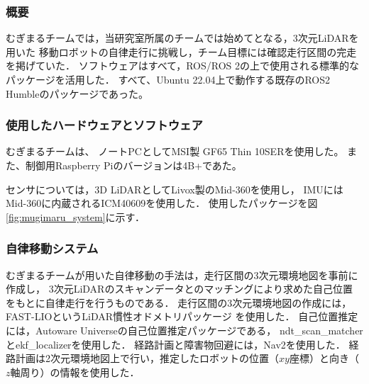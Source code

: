 \documentclass[twocolumn,9pt]{jsproceedings}
\begin{document}
\subsubsection{概要}

むぎまるチームでは，当研究室所属のチームでは始めてとなる，3次元LiDARを用いた
移動ロボットの自律走行に挑戦し，チーム目標には確認走行区間の完走を掲げていた．
ソフトウェアはすべて，ROS/ROS 2の上で使用される標準的なパッケージを活用した．
すべて、Ubuntu 22.04上で動作する既存のROS2 Humbleのパッケージであった。

\subsubsection{使用したハードウェアとソフトウェア}

むぎまるチームは、
ノートPCとしてMSI製 GF65 Thin 10SERを使用した。
また、制御用Raspberry Piのバージョンは4B+であた。

センサについては，3D LiDARとしてLivox製のMid-360を使用し，
IMUにはMid-360に内蔵されるICM40609を使用した．
使用したパッケージを図\ref{fig:mugimaru_system}に示す．

\subsubsection{自律移動システム}

むぎまるチームが用いた自律移動の手法は，走行区間の3次元環境地図を事前に作成し，
3次元LiDARのスキャンデータとのマッチングにより求めた自己位置
をもとに自律走行を行うものである．
走行区間の3次元環境地図の作成には，FAST-LIOというLiDAR慣性オドメトリパッケージ
\cite{fastlio}を使用した．
自己位置推定には，Autoware Universeの自己位置推定パッケージである，
ndt\_scan\_matcherとekf\_localizerを使用した\cite{autoware}．
経路計画と障害物回避には，Nav2を使用した\cite{nav2}．
経路計画は2次元環境地図上で行い，推定したロボットの位置（$xy$座標）と向き（$z$軸周り）の情報を使用した．
\end{document}
